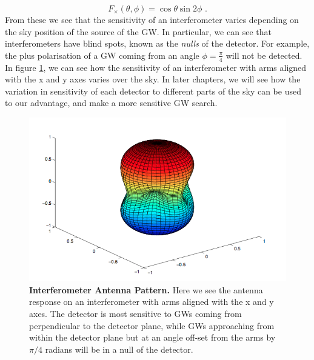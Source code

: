\documentclass[11pt]{cuthesis}
\newcommand{\fs}{\text{ .}}
\begin{document}
\begin{equation}
F_\times(\theta,\phi) = \cos \theta \sin 2\phi \fs
\end{equation}
From these we see that the sensitivity of an interferometer varies depending on the sky position of the source of the GW. In particular, we can see that interferometers have blind spots, known as the \textit{nulls} of the detector. For example, the plus polarisation of a GW coming from an angle $\phi=\frac{\pi}{4}$ will not be detected. In figure \ref{fig:antenna pattern}, we can see how the sensitivity of an interferometer with arms aligned with the x and y axes varies over the sky. In later chapters, we will see how the variation in sensitivity of each detector to different parts of the sky can be used to our advantage, and make a more sensitive GW search.





\begin{figure} %
\begin{center}
\includegraphics[width=0.8\linewidth]{antenna_pattern.png}
\end{center}
\caption{\textbf{Interferometer Antenna Pattern.} Here we see the antenna response on an interferometer with arms aligned with the x and y axes. The detector is most sensitive to GWs coming from perpendicular to the detector plane, while GWs approaching from within the detector plane but at an angle off-set from the arms by $\pi/4$ radians will be in a null of the detector. \cite{lrr-2009-2} }
\label{fig:antenna pattern}
\end{figure}
\end{document}

